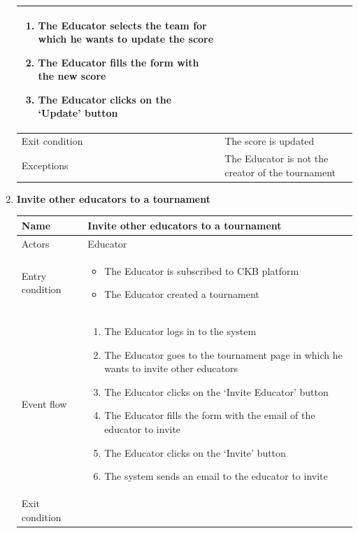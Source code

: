 \begin{enumerate}[label=UC\arabic*:]
\begin{tabular}{|p{3cm}|p{8cm}|}
\begin{enumerate}[label=\arabic*.]
            \item The Educator selects the team for which he wants to update the score
            \item The Educator fills the form with the new score
            \item The Educator clicks on the `Update' button
        \end{enumerate}
        \\
        \hline
        Exit condition & The score is updated \\
        \hline
        Exceptions & The Educator is not the creator of the tournament \\
        \hline
    \end{tabular}
    \item \textbf{Invite other educators to a tournament} \\
    \begin{tabular}{|p{3cm}|p{8cm}|}
        \hline
        Name & Invite other educators to a tournament \\
        \hline
        Actors & Educator \\
        \hline
        Entry condition &
        \begin{itemize}
            \item The Educator is subscribed to CKB platform
            \item The Educator created a tournament
        \end{itemize}
        \\
        \hline
        Event flow & 
        \begin{enumerate}[label=\arabic*.]
            \item The Educator logs in to the system
            \item The Educator goes to the tournament page in which he wants to invite other educators
            \item The Educator clicks on the `Invite Educator' button
            \item The Educator fills the form with the email of the educator to invite
            \item The Educator clicks on the `Invite' button
            \item The system sends an email to the educator to invite
        \end{enumerate}
        \\
        \hline
        Exit condition &
        \begin{itemize}

\end{itemize}
\end{tabular}
\end{enumerate}

